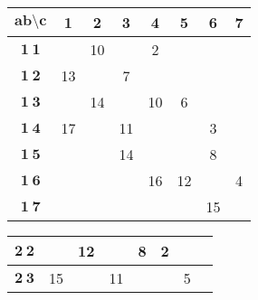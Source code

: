 \documentclass[a4paper,12pt]{report}
\begin{document}
\begin{center}
\begin{tabular}{|c||c|c|c|c|c|c|c|}\hline
$\textbf{ab} \setminus \textbf{c}$  & \textbf{1} & \textbf{2} & \textbf{3} & \textbf{4} & \textbf{5} & \textbf{6} & \textbf{7} \\
\hline \hline

$\textbf{1}\:\textbf{1}$ & \hspace{6mm} & 10 & & 2 & \hspace{6mm} & \hspace{6mm} & \hspace{6mm} \\
\hline

$\textbf{1}\:\textbf{2}$ & 13 & \hspace{6mm} & 7& \hspace{6mm} & & &  \\ \hline

$\textbf{1}\:\textbf{3}$&  & 14 & \hspace{6mm} & 10 & 6& &  \\ \hline

$\textbf{1}\:\textbf{4}$ & 17 &  &11 &  & & 3&  \\ \hline

$\textbf{1}\:\textbf{5}$ &  &  &14 &  & & 8&  \\ \hline

$\textbf{1}\:\textbf{6}$ &  &  & & 16 &12 & &4  \\ \hline

$\textbf{1}\:\textbf{7}$ &  &  & &  & & 15&  \\ \hline

\end{tabular}

\begin{tabular}{|c||c|c|c|c|c|c|c|}\hline
\hspace{1.5mm} $\textbf{2}\:\textbf{2}$ \hspace{1mm} & \hspace{6mm} & 12 & \hspace{6mm} &8 & 2& \hspace{6mm} & \hspace{6mm} \\
\hline

$\textbf{2}\:\textbf{3}$ & 15 & \hspace{6mm} & 11 & \hspace{6mm} & \hspace{6mm} & 5 & \\ \hline


\end{tabular}
\end{center}
\end{document}
